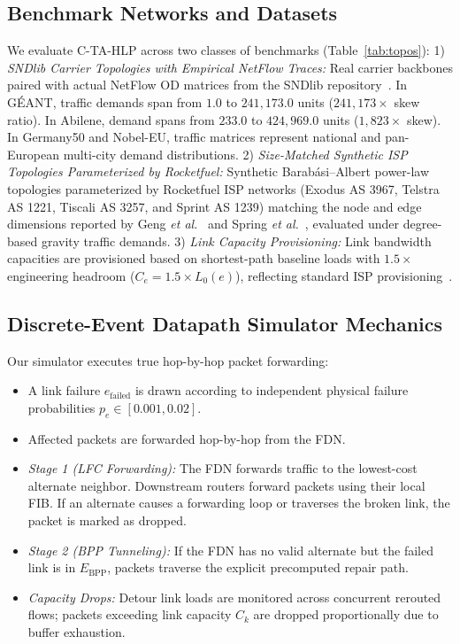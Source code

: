 \documentclass[journal]{IEEEtran}
\begin{document}
\subsection{Benchmark Networks and Datasets}
We evaluate C-TA-HLP across two classes of benchmarks (Table~\ref{tab:topos}):
1) \textit{SNDlib Carrier Topologies with Empirical NetFlow Traces:} Real carrier backbones paired with actual NetFlow OD matrices from the SNDlib repository~\cite{orlowski2010sndlib}. In G{\'E}ANT, traffic demands span from $1.0$ to $241,173.0$ units ($241,173\times$ skew ratio). In Abilene, demand spans from $233.0$ to $424,969.0$ units ($1,823\times$ skew). In Germany50 and Nobel-EU, traffic matrices represent national and pan-European multi-city demand distributions.
2) \textit{Size-Matched Synthetic ISP Topologies Parameterized by Rocketfuel:} Synthetic Barab{\'a}si--Albert power-law topologies parameterized by Rocketfuel ISP networks (Exodus AS 3967, Telstra AS 1221, Tiscali AS 3257, and Sprint AS 1239) matching the node and edge dimensions reported by Geng \textit{et al.}~\cite{geng2020hybrid} and Spring \textit{et al.}~\cite{spring2002measuring}, evaluated under degree-based gravity traffic demands.
3) \textit{Link Capacity Provisioning:} Link bandwidth capacities are provisioned based on shortest-path baseline loads with $1.5\times$ engineering headroom ($C_e = 1.5 \times L_0(e)$), reflecting standard ISP provisioning~\cite{fortz2002optimizing}.

\subsection{Discrete-Event Datapath Simulator Mechanics}
Our simulator executes true hop-by-hop packet forwarding:
\begin{itemize}
    \item A link failure $e_{\text{failed}}$ is drawn according to independent physical failure probabilities $p_e \in [0.001, 0.02]$.
    \item Affected packets are forwarded hop-by-hop from the FDN.
    \item \textit{Stage 1 (LFC Forwarding):} The FDN forwards traffic to the lowest-cost alternate neighbor. Downstream routers forward packets using their local FIB. If an alternate causes a forwarding loop or traverses the broken link, the packet is marked as dropped.
    \item \textit{Stage 2 (BPP Tunneling):} If the FDN has no valid alternate but the failed link is in $E_{\text{BPP}}$, packets traverse the explicit precomputed repair path.
    \item \textit{Capacity Drops:} Detour link loads are monitored across concurrent rerouted flows; packets exceeding link capacity $C_k$ are dropped proportionally due to buffer exhaustion.
\end{itemize}
\end{document}
